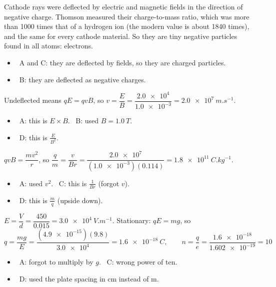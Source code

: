 \documentclass[12pt]{article}
\begin{document}
\begin{practiceanswers}
\begin{practiceans}
  Cathode rays were deflected by electric and magnetic fields in the direction of negative charge.
  Thomson measured their charge-to-mass ratio, which was more than 1000 times that of a hydrogen ion (the
  modern value is about 1840 times), and the same for every cathode material. So they are tiny negative particles found in all atoms: electrons.
  \begin{itemize}
    \item \xmark\ A and C: they are deflected by fields, so they are charged particles.
    \item \xmark\ B: they are deflected as negative charges.
  \end{itemize}
\end{practiceans}

\begin{practiceans}
  Undeflected means $qE = qvB$, so $v = \dfrac{E}{B} = \dfrac{\num{2.0e4}}{\num{1.0e-3}} = \qty{2.0e7}{m.s^{-1}}$.
  \begin{itemize}
    \item \xmark\ A: this is $E \times B$. \quad \xmark\ B: used $B = \qty{1.0}{T}$.
    \item \xmark\ D: this is $\frac{E}{B^2}$.
  \end{itemize}
\end{practiceans}

\begin{practiceans}
  $qvB = \dfrac{mv^2}{r}$, so $\dfrac{q}{m} = \dfrac{v}{Br} = \dfrac{\num{2.0e7}}{(\num{1.0e-3})(0.114)}
  = \qty{1.8e11}{C.kg^{-1}}$.
  \begin{itemize}
    \item \xmark\ A: used $v^2$. \quad \xmark\ C: this is $\frac{1}{Br}$ (forgot $v$).
    \item \xmark\ D: this is $\frac{m}{q}$ (upside down).
  \end{itemize}
\end{practiceans}

\begin{practiceans}
  $E = \dfrac{V}{d} = \dfrac{450}{0.015} = \qty{3.0e4}{V.m^{-1}}$. Stationary: $qE = mg$, so
  \[ q = \frac{mg}{E} = \frac{(\num{4.9e-15})(9.8)}{\num{3.0e4}} = \qty{1.6e-18}{C}, \qquad
     n = \frac{q}{e} = \frac{\num{1.6e-18}}{\num{1.602e-19}} = 10 \]
  \begin{itemize}
    \item \xmark\ A: forgot to multiply by $g$. \quad \xmark\ C: wrong power of ten.
    \item \xmark\ D: used the plate spacing in cm instead of m.
  \end{itemize}
\end{practiceans}


\end{practiceanswers}
\end{document}

